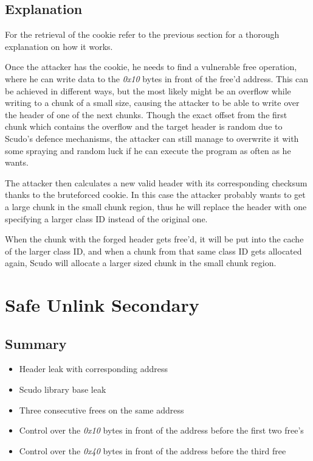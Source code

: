 \documentclass[a4paper,11pt,oneside]{report}
\begin{document}
\subsection{Explanation}

For the retrieval of the cookie refer to the previous section for a thorough explanation
on how it works.

Once the attacker has the cookie, he needs to find a vulnerable free operation, where he
can write data to the \emph{0x10} bytes in front of the free'd address. This can be
achieved in different ways, but the most likely might be an overflow while writing to a
chunk of a small size, causing the attacker to be able to write over the header of one of
the next chunks. Though the exact offset from the first chunk which contains the overflow
and the target header is random due to Scudo's defence mechanisms, the attacker can still
manage to overwrite it with some spraying and random luck if he can execute the program as
often as he wants.

The attacker then calculates a new valid header with its corresponding checksum thanks to
the bruteforced cookie. In this case the attacker probably wants to get a large chunk in
the small chunk region, thus he will replace the header with one specifying a larger class
ID instead of the original one.


When the chunk with the forged header gets free'd, it will be put into the cache of the
larger class ID, and when a chunk from that same class ID gets allocated again, Scudo will
allocate a larger sized chunk in the small chunk region.

\section{Safe Unlink Secondary}


\subsection{Summary}

\begin{itemize}
\item Header leak with corresponding address
\item Scudo library base leak
\item Three consecutive frees on the same address
\item Control over the \emph{0x10} bytes in front of the address before the first two
  free's
\item Control over the \emph{0x40} bytes in front of the address before the third free
\end{itemize}
\end{document}
